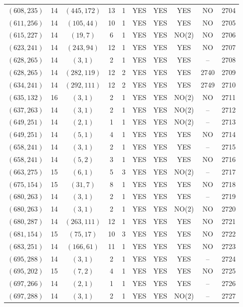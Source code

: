 \begin{longtable}{|c|c|c|c|c|c|c|c|c|c|}
$(608, 235)$ & 14 & $(445, 172)$ & 13 & 1 & YES & YES & YES & NO & 2704\\
$(611, 256)$ & 14 & $(105, 44)$ & 10 & 1 & YES & YES & YES & NO & 2705\\
$(615, 227)$ & 14 & $(19, 7)$ & 6 & 1 & YES & YES & NO(2) & NO & 2706\\
$(623, 241)$ & 14 & $(243, 94)$ & 12 & 1 & YES & YES & YES & NO & 2707\\
$(628, 265)$ & 14 & $(3, 1)$ & 2 & 1 & YES & YES & YES & -- & 2708\\
$(628, 265)$ & 14 & $(282, 119)$ & 12 & 2 & YES & YES & YES & 2740 & 2709\\
$(634, 241)$ & 14 & $(292, 111)$ & 12 & 2 & YES & YES & YES & 2749 & 2710\\
$(635, 132)$ & 16 & $(3, 1)$ & 2 & 1 & YES & YES & NO(2) & NO & 2711\\
$(637, 263)$ & 14 & $(3, 1)$ & 2 & 1 & YES & YES & NO(2) & -- & 2712\\
$(649, 251)$ & 14 & $(2, 1)$ & 1 & 1 & YES & YES & NO(2) & -- & 2713\\
$(649, 251)$ & 14 & $(5, 1)$ & 4 & 1 & YES & YES & YES & NO & 2714\\
$(658, 241)$ & 14 & $(3, 1)$ & 2 & 1 & YES & YES & YES & -- & 2715\\
$(658, 241)$ & 14 & $(5, 2)$ & 3 & 1 & YES & YES & YES & NO & 2716\\
$(663, 275)$ & 15 & $(6, 1)$ & 5 & 3 & YES & YES & NO(2) & -- & 2717\\
$(675, 154)$ & 15 & $(31, 7)$ & 8 & 1 & YES & YES & YES & NO & 2718\\
$(680, 263)$ & 14 & $(3, 1)$ & 2 & 1 & YES & YES & YES & -- & 2719\\
$(680, 263)$ & 14 & $(3, 1)$ & 2 & 1 & YES & YES & NO(2) & NO & 2720\\
$(680, 287)$ & 14 & $(263, 111)$ & 12 & 1 & YES & YES & YES & NO & 2721\\
$(681, 154)$ & 15 & $(75, 17)$ & 10 & 3 & YES & YES & YES & NO & 2722\\
$(683, 251)$ & 14 & $(166, 61)$ & 11 & 1 & YES & YES & YES & NO & 2723\\
$(695, 288)$ & 14 & $(3, 1)$ & 2 & 1 & YES & YES & YES & -- & 2724\\
$(695, 202)$ & 15 & $(7, 2)$ & 4 & 1 & YES & YES & YES & NO & 2725\\
$(697, 266)$ & 14 & $(2, 1)$ & 1 & 1 & YES & YES & YES & -- & 2726\\
$(697, 288)$ & 14 & $(3, 1)$ & 2 & 1 & YES & YES & NO(2) & -- & 2727\\

\end{longtable}
